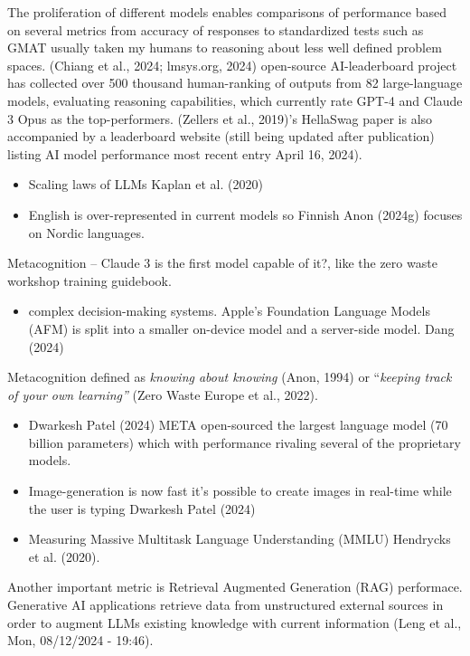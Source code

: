 \documentclass[
  letterpaper,
  DIV=11,
  numbers=noendperiod]{scrartcl}
\providecommand{\tightlist}{%
  \setlength{\itemsep}{0pt}\setlength{\parskip}{0pt}}\usepackage{longtable,booktabs,array}
\begin{document}
The proliferation of different models enables comparisons of performance
based on several metrics from accuracy of responses to standardized
tests such as GMAT usually taken my humans to reasoning about less well
defined problem spaces. (Chiang et al., 2024; lmsys.org, 2024)
open-source AI-leaderboard project has collected over 500 thousand
human-ranking of outputs from 82 large-language models, evaluating
reasoning capabilities, which currently rate GPT-4 and Claude 3 Opus as
the top-performers. (Zellers et al., 2019)'s HellaSwag paper is also
accompanied by a leaderboard website (still being updated after
publication) listing AI model performance most recent entry April 16,
2024).

\begin{itemize}
\item
  Scaling laws of LLMs Kaplan et al. (2020)
\item
  English is over-represented in current models so Finnish Anon (2024g)
  focuses on Nordic languages.
\end{itemize}

Metacognition -- Claude 3 is the first model capable of it?, like the
zero waste workshop training guidebook.

\begin{itemize}
\tightlist
\item
  complex decision-making systems. Apple's Foundation Language Models
  (AFM) is split into a smaller on-device model and a server-side model.
  Dang (2024)
\end{itemize}

Metacognition defined as \emph{knowing about knowing} (Anon, 1994) or
``\emph{keeping track of your own learning''} (Zero Waste Europe et al.,
2022).

\begin{itemize}
\item
  Dwarkesh Patel (2024) META open-sourced the largest language model (70
  billion parameters) which with performance rivaling several of the
  proprietary models.
\item
  Image-generation is now fast it's possible to create images in
  real-time while the user is typing Dwarkesh Patel (2024)
\item
  Measuring Massive Multitask Language Understanding (MMLU) Hendrycks et
  al. (2020).
\end{itemize}

Another important metric is Retrieval Augmented Generation (RAG)
performace. Generative AI applications retrieve data from unstructured
external sources in order to augment LLMs existing knowledge with
current information (Leng et al., Mon, 08/12/2024 - 19:46).
\end{document}
